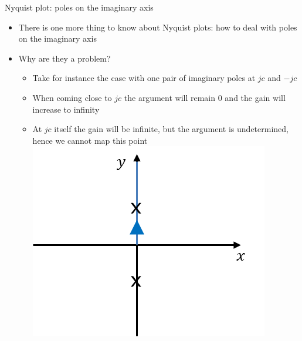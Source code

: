 \begin{frame}{Nyquist plot: poles on the imaginary axis}
\begin{itemize}
\item There is one more thing to know about Nyquist plots: how to deal with poles on the imaginary axis
\item Why are they a problem?
\\ \begin{itemize}
\item Take for instance the case with one pair of imaginary poles at $jc$ and $-jc$
\item When coming close to $jc$ the argument will remain $0$ and the gain will increase to infinity
\item At $jc$ itself the gain will be infinite, but the argument is undetermined, hence we cannot map this point
\\ \includegraphics[width=0.5\linewidth]{Afbeelding13}
\end{itemize}
\end{itemize}
\end{frame}

